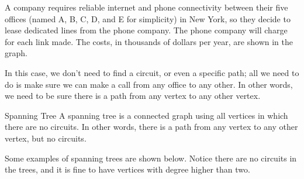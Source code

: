 A company requires reliable internet and phone connectivity between their five offices (named A, B, C, D, and E for simplicity) in New York, so they decide to lease dedicated lines from the phone company.  The phone company will charge for each link made.  The costs, in thousands of dollars per year, are shown in the graph.

\begin{center}
\par{}\label{fig:graphtheory-dor1-tikz23}%

\end{center}

In this case, we don't need to find a circuit, or even a specific path; all we need to do is make sure we can make a call from any office to any other.  In other words, we need to be sure there is a path from any vertex to any other vertex.

\begin{definition}{Spanning Tree}
A spanning tree is a connected graph using all vertices in which there are no circuits.  
In other words, there is a path from any vertex to any other vertex, but no circuits.   
\end{definition}

Some examples of spanning trees are shown below.  Notice there are no circuits in the trees, and it is fine to have vertices with degree higher than two.\\

